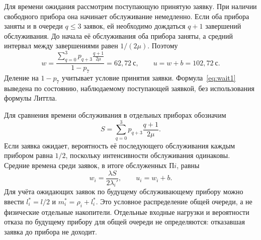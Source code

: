 \documentclass[11pt,a4paper]{article}
\newcommand{\secs}{\text{с}}
\begin{document}
Для времени ожидания рассмотрим поступающую принятую заявку. При наличии свободного прибора она начинает обслуживание немедленно. Если оба прибора заняты и в очереди $q\le3$ заявок, ей необходимо дождаться $q+1$ завершений обслуживания. До начала её обслуживания оба прибора заняты, а средний интервал между завершениями равен $1/(2\mu)$. Поэтому
\begin{equation}
w=\frac{\displaystyle\sum_{q=0}^{3}p_{q+3}\frac{q+1}{2\mu}}{1-p_7}
=62{,}72\ \secs,\qquad u=w+b=102{,}72\ \secs.
\label{eq:wait1}
\end{equation}
Деление на $1-p_7$ учитывает условие принятия заявки. Формула~\eqref{eq:wait1} выведена по состоянию, наблюдаемому поступающей заявкой, без использования формулы Литтла.

Для сравнения времени обслуживания в отдельных приборах обозначим
\[
S=\sum_{q=0}^{3}p_{q+3}\frac{q+1}{2\mu}.
\]
Если заявка ожидает, вероятность её последующего обслуживания каждым прибором равна $1/2$, поскольку интенсивности обслуживания одинаковы. Средние времена среди заявок, в итоге обслуженных П$i$, равны
\begin{equation}
w_i=\frac{\lambda S}{2\lambda_i'},\qquad u_i=w_i+b.
\end{equation}
Для учёта ожидающих заявок по будущему обслуживающему прибору можно ввести $l_i^*=l/2$ и $m_i^*=\rho_i+l_i^*$. Это условное распределение общей очереди, а не физические отдельные накопители. Отдельные входные нагрузки и вероятности отказа по будущему прибору для общей очереди не определяются: отказавшая заявка до прибора не доходит.

\newpage
\end{document}
